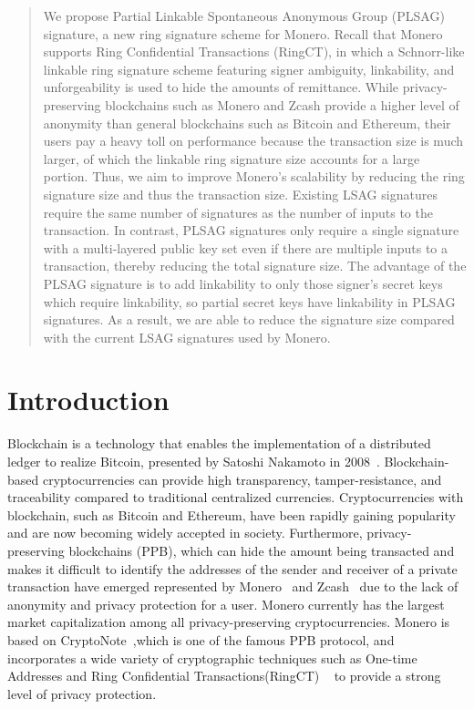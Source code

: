 \begin{abstract}
    We propose Partial Linkable Spontaneous Anonymous Group (PLSAG) signature, a new ring signature scheme for Monero. Recall that Monero supports Ring Confidential Transactions (RingCT), in which a Schnorr-like linkable ring signature scheme featuring signer ambiguity, linkability, and unforgeability is used to hide the amounts of remittance. While privacy-preserving blockchains such as Monero and Zcash provide a higher level of anonymity than general blockchains such as Bitcoin and Ethereum, their users pay a heavy toll on performance because the transaction size is much larger, of which the linkable ring signature size accounts for a large portion. Thus, we aim to improve Monero's scalability by reducing the ring signature size and thus the transaction size. Existing LSAG signatures require the same number of signatures as the number of inputs to the transaction. In contrast, PLSAG signatures only require a single signature with a multi-layered public key set even if there are multiple inputs to a transaction, thereby reducing the total signature size. The advantage of the PLSAG signature is to add linkability to only those signer’s secret keys which require linkability, so partial secret keys have linkability in PLSAG signatures. As a result, we are able to reduce the signature size compared with the current LSAG signatures used by Monero.
\end{abstract}

\section{Introduction}
    Blockchain is a technology that enables the implementation of a distributed ledger to realize Bitcoin, presented by Satoshi Nakamoto in 2008~\cite{Nakamoto_bitcoin}. Blockchain-based cryptocurrencies can provide high transparency, tamper-resistance, and traceability compared to traditional centralized currencies. Cryptocurrencies with blockchain, such as Bitcoin and Ethereum, have been rapidly gaining popularity and are now becoming widely accepted in society. Furthermore, privacy-preserving blockchains (PPB), which can hide the amount being transacted and makes it difficult to identify the addresses of the sender and receiver of a private transaction have emerged represented by Monero~\cite{ztm} and Zcash~\cite{zerocash} due to the lack of anonymity and privacy protection for a user. Monero currently has the largest market capitalization among all privacy-preserving cryptocurrencies. Monero is based on CryptoNote~\cite{cryptoNote},which is one of the famous PPB protocol, and incorporates a wide variety of cryptographic techniques such as One-time Addresses and Ring Confidential Transactions(RingCT) ~\cite{RingCT-for-Monero} to provide a strong level of privacy protection. 
    
